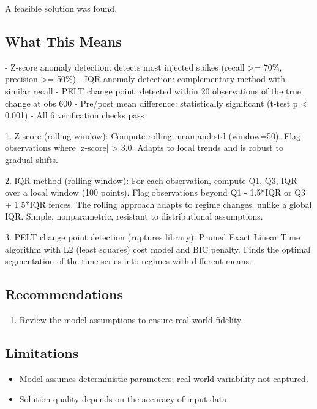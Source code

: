 \documentclass[11pt, a4paper]{article}
\begin{document}
\begin{polyainsight}[title={Bottom Line}]
A feasible solution was found.
\end{polyainsight}

\subsection{What This Means}

- Z-score anomaly detection: detects most injected spikes (recall >= 70\%, precision >= 50\%)
- IQR anomaly detection: complementary method with similar recall
- PELT change point: detected within 20 observations of the true change at obs 600
- Pre/post mean difference: statistically significant (t-test p < 0.001)
- All 6 verification checks pass

1. Z-score (rolling window): Compute rolling mean and std (window=50). Flag observations where |z-score| > 3.0. Adapts to local trends and is robust to gradual shifts.

2. IQR method (rolling window): For each observation, compute Q1, Q3, IQR over a local window (100 points). Flag observations beyond Q1 - 1.5*IQR or Q3 + 1.5*IQR fences. The rolling approach adapts to regime changes, unlike a global IQR. Simple, nonparametric, resistant to distributional assumptions.

3. PELT change point detection (ruptures library): Pruned Exact Linear Time algorithm with L2 (least squares) cost model and BIC penalty. Finds the optimal segmentation of the time series into regimes with different means.



\subsection{Recommendations}

\begin{enumerate}
  \item Review the model assumptions to ensure real-world fidelity.
\end{enumerate}

\subsection{Limitations}

\begin{polyawarnbox}
\begin{itemize}
  \item Model assumes deterministic parameters; real-world variability not captured.
  \item Solution quality depends on the accuracy of input data.
\end{itemize}
\end{polyawarnbox}

\end{document}
